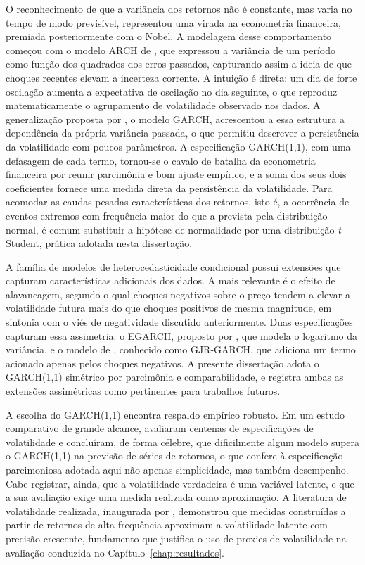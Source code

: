 O reconhecimento de que a variância dos retornos não é constante, mas varia no tempo de modo previsível, representou uma virada na econometria financeira, premiada posteriormente com o Nobel. A modelagem desse comportamento começou com o modelo ARCH de , que expressou a variância de um período como função dos quadrados dos erros passados, capturando assim a ideia de que choques recentes elevam a incerteza corrente. A intuição é direta: um dia de forte oscilação aumenta a expectativa de oscilação no dia seguinte, o que reproduz matematicamente o agrupamento de volatilidade observado nos dados. A generalização proposta por , o modelo GARCH, acrescentou a essa estrutura a dependência da própria variância passada, o que permitiu descrever a persistência da volatilidade com poucos parâmetros. A especificação GARCH(1,1), com uma defasagem de cada termo, tornou-se o cavalo de batalha da econometria financeira por reunir parcimônia e bom ajuste empírico, e a soma dos seus dois coeficientes fornece uma medida direta da persistência da volatilidade. Para acomodar as caudas pesadas características dos retornos, isto é, a ocorrência de eventos extremos com frequência maior do que a prevista pela distribuição normal, é comum substituir a hipótese de normalidade por uma distribuição \textit{t}-Student, prática adotada nesta dissertação.

A família de modelos de heterocedasticidade condicional possui extensões que capturam características adicionais dos dados. A mais relevante é o efeito de alavancagem, segundo o qual choques negativos sobre o preço tendem a elevar a volatilidade futura mais do que choques positivos de mesma magnitude, em sintonia com o viés de negatividade discutido anteriormente. Duas especificações capturam essa assimetria: o EGARCH, proposto por , que modela o logaritmo da variância, e o modelo de , conhecido como GJR-GARCH, que adiciona um termo acionado apenas pelos choques negativos. A presente dissertação adota o GARCH(1,1) simétrico por parcimônia e comparabilidade, e registra ambas as extensões assimétricas como pertinentes para trabalhos futuros.

A escolha do GARCH(1,1) encontra respaldo empírico robusto. Em um estudo comparativo de grande alcance,  avaliaram centenas de especificações de volatilidade e concluíram, de forma célebre, que dificilmente algum modelo supera o GARCH(1,1) na previsão de séries de retornos, o que confere à especificação parcimoniosa adotada aqui não apenas simplicidade, mas também desempenho. Cabe registrar, ainda, que a volatilidade verdadeira é uma variável latente, e que a sua avaliação exige uma medida realizada como aproximação. A literatura de volatilidade realizada, inaugurada por , demonstrou que medidas construídas a partir de retornos de alta frequência aproximam a volatilidade latente com precisão crescente, fundamento que justifica o uso de proxies de volatilidade na avaliação conduzida no Capítulo~\ref{chap:resultados}.

